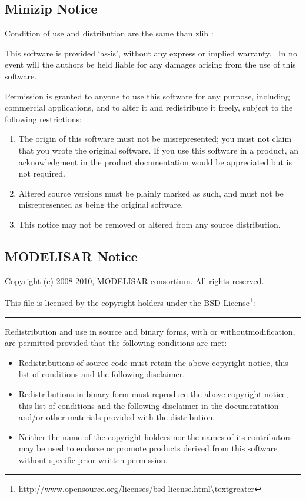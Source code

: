 \subsection{Minizip Notice}\label{minizip-notice}

Condition of use and distribution are the same than zlib :

This software is provided `as-is', without any express or implied warranty.~ In no event will the authors be held liable for any damages arising from the use of this software.

Permission is granted to anyone to use this software for any purpose, including commercial applications, and to alter it and redistribute it freely, subject to the following restrictions:

\begin{enumerate}
\def\labelenumi{\arabic{enumi}.}
\item
  The origin of this software must not be misrepresented; you must not claim that you wrote the original software. If you use this software in a product, an acknowledgment in the product documentation would be appreciated but is not required.
\item
  Altered source versions must be plainly marked as such, and must not be misrepresented as being the original software.
\item
  This notice may not be removed or altered from any source distribution.
\end{enumerate}

\subsection{MODELISAR Notice}\label{modelisar-notice}

Copyright (c) 2008-2010, MODELISAR consortium. All rights reserved.

This file is licensed by the copyright holders under the BSD License\footnote{\url{http://www.opensource.org/licenses/bsd-license.html\textgreater}}:

\begin{center}\rule{0.5\linewidth}{\linethickness}\end{center}

Redistribution and use in source and binary forms, with or withoutmodification, are permitted provided that the following conditions are met:

\begin{itemize}
\item
  Redistributions of source code must retain the above copyright notice, this list of conditions and the following disclaimer.
\item
  Redistributions in binary form must reproduce the above copyright notice, this list of conditions and the following disclaimer in the documentation and/or other materials provided with the distribution.
\item
  Neither the name of the copyright holders nor the names of its contributors may be used to endorse or promote products derived from this software without specific prior written permission.
\end{itemize}

